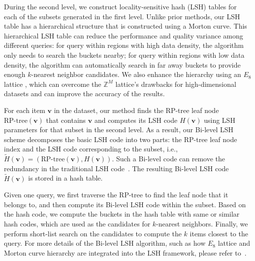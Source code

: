 During the second level, we construct locality-sensitive hash (LSH) tables for each of the subsets generated in the first level. Unlike prior methods, our LSH table has a hierarchical structure that is constructed using a Morton curve. This hierarchical LSH table can reduce the performance and quality variance among different queries: for query within regions with high data density, the algorithm only needs to search the buckets nearby; for query within regions with low data density, the algorithm can automatically search in far away buckets to provide enough $k$-nearest neighbor candidates. We also enhance the hierarchy using an $E_8$ lattice , which can overcome the $\mathbb Z^M$ lattice's drawbacks for high-dimensional datasets and can improve the accuracy of the results.

For each item $\mathbf v$ in the dataset, our method finds the RP-tree leaf node $\text{RP-tree}(\mathbf v)$ that contains $\mathbf v$ and computes its LSH code $H(\mathbf v)$ using LSH parameters for that subset in the second level. As a result, our Bi-level LSH scheme decomposes the basic LSH code into two parts: the RP-tree leaf node index and the LSH code corresponding to the subset, i.e., $\tilde{H}(\mathbf v) = (\text{RP-tree}(\mathbf v), H(\mathbf v))$. Such a Bi-level code can remove the redundancy in the traditional LSH code~\cite{BilevelLSH2011}.
The resulting Bi-level LSH code $\tilde{H}(\mathbf v)$ is stored in a hash table.

Given one query, we first traverse the RP-tree to find the leaf node that it belongs to, and then compute its Bi-level LSH code within the subset. Based on the hash code, we compute the buckets in the hash table with same or similar hash codes, which are used as the candidates for $k$-nearest neighbors. Finally, we perform short-list search on the candidates to compute the $k$ items closest to the query. For more details of the Bi-level LSH algorithm, such as how $E_8$ lattice and Morton curve hierarchy are integrated into the LSH framework, please refer to~\cite{BilevelLSH2011}.

